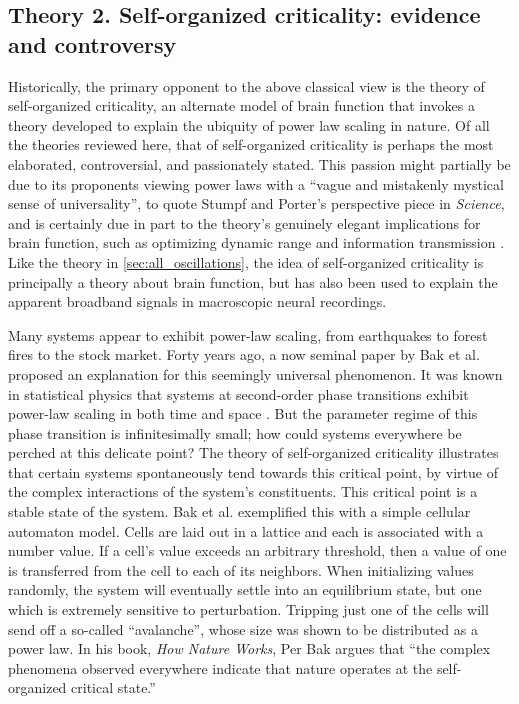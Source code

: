 \subsection{Theory 2. Self-organized criticality: evidence and controversy} \label{sec:SOC}

Historically, the primary opponent to the above classical view is the theory of self-organized criticality, an alternate model of brain function that invokes a theory developed to explain the ubiquity of power law scaling in nature. Of all the theories reviewed here, that of self-organized criticality is perhaps the most elaborated, controversial, and passionately stated. This passion might partially be due to its proponents viewing power laws with a ``vague and mistakenly mystical sense of universality'', to quote Stumpf and Porter’s perspective piece in \textit{Science}\cite{Stumpf2012}, and is certainly due in part to the theory’s genuinely elegant implications for brain function, such as optimizing dynamic range \cite{Kinouchi2006} and information transmission \cite{Shriki2016}. Like the theory in \autoref{sec:all_oscillations}, the idea of self-organized criticality is principally a theory about brain function, but has also been used to explain the apparent broadband signals in macroscopic neural recordings. 

Many systems appear to exhibit power-law scaling, from earthquakes to forest fires to the stock market. Forty years ago, a now seminal paper by Bak et al. \cite{Bak1987} proposed an explanation for this seemingly universal phenomenon. It was known in statistical physics that systems at second-order phase transitions exhibit power-law scaling in both time and space \cite{pathria2016statistical}. But the parameter regime of this phase transition is infinitesimally small; how could systems everywhere be perched at this delicate point? The theory of self-organized criticality illustrates that certain systems spontaneously tend towards this critical point, by virtue of the complex interactions of the system's constituents. This critical point is a stable state of the system. Bak et al. \cite{Bak1987} exemplified this with a simple cellular automaton model. Cells are laid out in a lattice and each is associated with a number value. If a cell’s value exceeds an arbitrary threshold, then a value of one is transferred from the cell to each of its neighbors. When initializing values randomly, the system will eventually settle into an equilibrium state, but one which is extremely sensitive to perturbation. Tripping just one of the cells will send off a so-called “avalanche”, whose size was shown to be distributed as a power law. In his book, \textit{How Nature Works}\cite{Bak1996}, Per Bak argues that “the complex phenomena observed everywhere indicate that nature operates at the self-organized critical state.”

